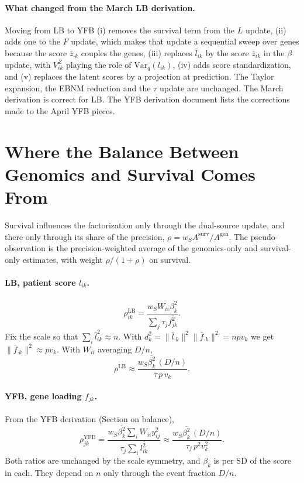 \documentclass[11pt]{article}
\newcommand{\Var}{\mathrm{Var}_q}
\newcommand{\ws}{w_S}
\begin{document}
\paragraph{What changed from the March LB derivation.} Moving from LB to YFB
(i) removes the survival term from the $L$ update, (ii) adds one to the $F$
update, which makes that update a sequential sweep over genes because the score
$\bar z_{\cdot k}$ couples the genes, (iii) replaces $\bar l_{ik}$ by the score
$\bar z_{ik}$ in the $\beta$ update, with $V^Z_{ik}$ playing the role of
$\Var(l_{ik})$, (iv) adds score standardization, and (v) replaces the latent
scores by a projection at prediction. The Taylor expansion, the EBNM reduction
and the $\tau$ update are unchanged. The March derivation is correct for LB.
The YFB derivation document lists the corrections made to the April YFB pieces.

\section{Where the Balance Between Genomics and Survival Comes From}\label{sec:balance}

Survival influences the factorization only through the dual-source update, and
there only through its share of the precision,
$\rho = \ws A^{\text{surv}}/A^{\text{gen}}$. The pseudo-observation is the
precision-weighted average of the genomics-only and survival-only estimates,
with weight $\rho/(1+\rho)$ on survival.

\paragraph{LB, patient score $l_{ik}$.}
\[
  \rho^{\text{LB}}_{ik} = \frac{\ws W_{ii}\overline{\beta^2_k}}{\sum_j\tau_j\overline{f^2_{jk}}} .
\]
Fix the scale so that $\sum_i\bar l_{ik}^2\approx n$. With $d_k^2 = \lVert\bar l_{\cdot k}\rVert^2\lVert\bar f_{\cdot k}\rVert^2 = npv_k$
we get $\lVert\bar f_{\cdot k}\rVert^2\approx pv_k$. With $W_{ii}$ averaging $D/n$,
\[
  \rho^{\text{LB}} \approx \frac{\ws\overline{\beta^2_k}\,(D/n)}{\bar\tau\,p\,v_k}.
\]

\paragraph{YFB, gene loading $f_{jk}$.} From the YFB derivation (Section on
balance),
\[
  \rho^{\text{YFB}}_{jk} = \frac{\ws\overline{\beta^2_k}\sum_iW_{ii}y_{ij}^2}{\tau_j\sum_i\overline{l^2_{ik}}}
  \approx \frac{\ws\overline{\beta^2_k}\,(D/n)}{\tau_j\,p^2v_k^2}.
\]
Both ratios are unchanged by the scale symmetry, and $\beta_k$ is per SD of the
score in each. They depend on $n$ only through the event fraction $D/n$.
\end{document}
